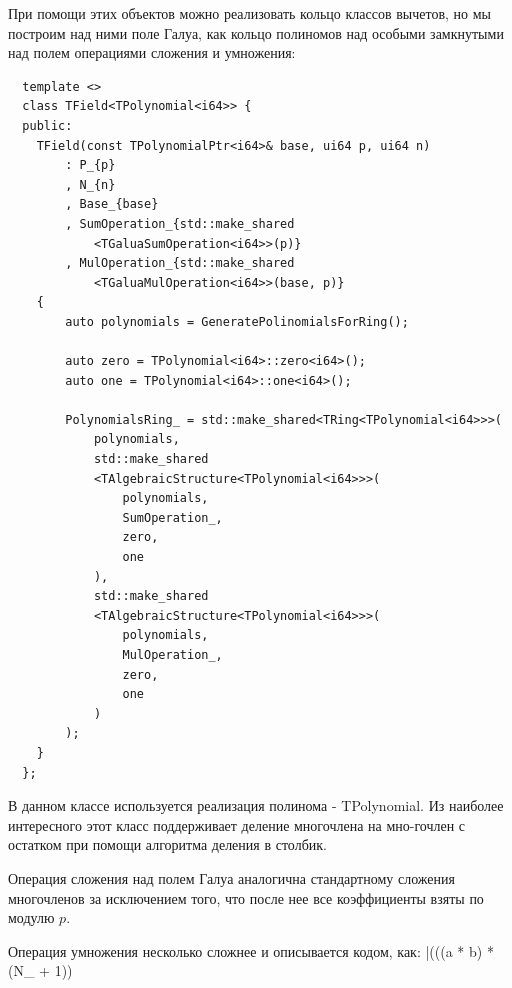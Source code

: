 \documentclass[a4paper]{article}
\newenvironment{code}{\captionsetup{type=listing}}{}
\begin{document}
При помощи этих объектов можно реализовать кольцо классов вычетов, но мы построим над ними поле Галуа,
как кольцо полиномов над особыми замкнутыми над полем операциями сложения и умножения:
\begin{code}
\begin{verbatim}
  template <>
  class TField<TPolynomial<i64>> {
  public:
    TField(const TPolynomialPtr<i64>& base, ui64 p, ui64 n)
        : P_{p}
        , N_{n}
        , Base_{base}
        , SumOperation_{std::make_shared
            <TGaluaSumOperation<i64>>(p)}
        , MulOperation_{std::make_shared
            <TGaluaMulOperation<i64>>(base, p)}
    {
        auto polynomials = GeneratePolinomialsForRing();

        auto zero = TPolynomial<i64>::zero<i64>();
        auto one = TPolynomial<i64>::one<i64>();
    
        PolynomialsRing_ = std::make_shared<TRing<TPolynomial<i64>>>(
            polynomials,
            std::make_shared
            <TAlgebraicStructure<TPolynomial<i64>>>(
                polynomials,
                SumOperation_,
                zero,
                one
            ),
            std::make_shared
            <TAlgebraicStructure<TPolynomial<i64>>>(
                polynomials,
                MulOperation_,
                zero,
                one
            )
        );
    }
  };
\end{verbatim}
\end{code}

В данном классе используется реализация полинома - TPolynomial. Из наиболее интересного этот класс поддерживает
деление многочлена на мно-гочлен с остатком при помощи алгоритма деления в столбик.

Операция сложения над полем Галуа аналогична стандартному сложения многочленов за исключением того, что после
нее все коэффициенты взяты по модулю $p$.

Операция умножения несколько сложнее и описывается кодом, как: |(((a * b) * (N_ + 1)) %
\end{document}
